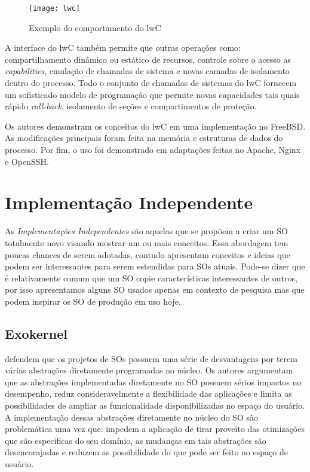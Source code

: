 \begin{figure}[!h]
  \centering
  \texttt{[image: lwc]} 
  \caption{Exemplo do comportamento do lwC}
  \label{fig:lwc} 
\end{figure}

A interface do lwC também permite que outras operações como: compartilhamento
dinâmico ou estático de recursos, controle sobre o acesso as
\emph{capabilities}, emulação de chamadas de sistema e novas camadas de
isolamento dentro do processo. Todo o conjunto de chamadas de sistemas do lwC
fornecem um sofisticado modelo de programação que permite novas capacidades
tais quais rápido \emph{roll-back}, isolamento de seções e compartimentos de
proteção.

Os autores demonstram os conceitos do lwC em uma implementação no FreeBSD. As
modificações principais foram feita na memória e estruturas de dados do
processo. Por fim, o uso foi demonstrado em adaptações feitas no Apache, Nginx
e OpenSSH.

\section{Implementação Independente}

As \textit{Implementações Independentes} são aquelas que se propõem a criar um
SO totalmente novo visando mostrar um ou mais conceitos. Essa abordagem tem
poucas chances de serem adotadas, contudo apresentam conceitos e ideias que
podem ser interessantes para serem estendidas para SOs atuais. Pode-se dizer
que é relativamente comum que um SO copie características interessantes de
outros, por isso apresentamos alguns SO usados apenas em contexto de pesquisa
mas que podem inspirar os SO de produção em uso hoje.

\subsection{Exokernel}

\cite{exokernel} defendem que os projetos de SOs possuem uma série de
desvantagens por terem várias abstrações diretamente programadas no núcleo. Os
autores argumentam que as abstrações implementadas diretamente no SO possuem
sérios impactos no desempenho, reduz consideravelmente a flexibilidade das
aplicações e limita as possibilidades de ampliar as funcionalidade
disponibilizadas no espaço do usuário. A implementação dessas abstrações
diretamente no núcleo do SO são problemática uma vez que: impedem a aplicação
de tirar proveito das otimizações que são especificas do seu domínio, as
mudanças em tais abstrações são desencorajadas e reduzem as possibilidade do
que pode ser feito no espaço de usuário.

